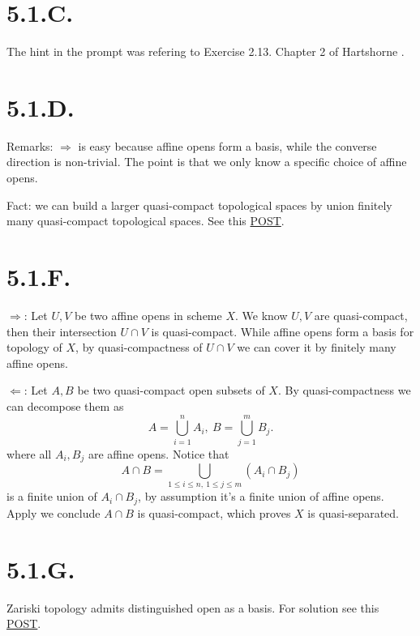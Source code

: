 \section{5.1.C.}

The hint in the prompt was refering to Exercise 2.13.  Chapter 2 of Hartshorne \cite{hartshorne2013algebraic}.

\section{5.1.D.}\label{5.1.D.}

Remarks: $\Rightarrow$ is easy because affine opens form a basis, while the converse direction is non-trivial. The point is that we only know a specific choice of affine opens. 

Fact: we can build a larger quasi-compact topological spaces by union finitely many quasi-compact topological spaces. See this \href{https://math.stackexchange.com/questions/816938/quasicompact-scheme-are-finite-union-of-affine-scheme}{POST}.

\section{5.1.F.}\label{5.1.F.}

$\Rightarrow$: Let $U,V$ be two affine opens in scheme $X$. We know $U,V$ are quasi-compact, then their intersection $U\cap V$ is quasi-compact. While affine opens form a basis for topology of $X$, by quasi-compactness of $U\cap V$ we can cover it by finitely many affine opens. 

$\Leftarrow$: Let $A,B$ be two quasi-compact open subsets of $X$. By quasi-compactness we can decompose them as 
\[A=\bigcup_{i=1}^n A_i,~ B=\bigcup_{j=1}^m B_j.\] where all $A_i,B_j$ are affine opens. 
Notice that \[A\cap B=\bigcup_{1\leq i\leq n,~ 1\leq j\leq m}(A_i\cap B_j)\] is a finite union of $A_i\cap B_j$, by assumption it's a finite union of affine opens. Apply  we conclude $A\cap B$ is quasi-compact, which proves $X$ is quasi-separated.

\section{5.1.G.}\label{5.1.G.}

Zariski topology admits distinguished open as a basis. For solution see this \href{https://math.stackexchange.com/questions/130502/affine-schemes-are-quasi-separated}{POST}.

